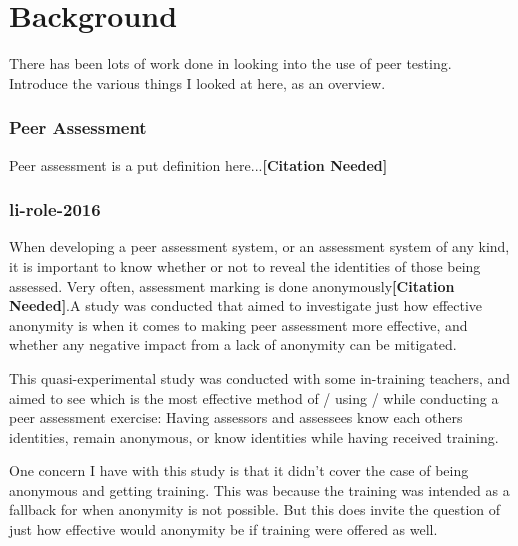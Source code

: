 \documentclass[a4paper,11pt]{report}
\newcommand{\cn}{\textbf{[Citation Needed]}}
\begin{document}
\chapter{Background}
There has been lots of work done in looking into the use of peer testing. Introduce the various things I looked at here, as an overview.
\subsection{Peer Assessment}
Peer assessment is a put definition here...\cn

\subsection{li-role-2016}
When developing a peer assessment system, or an assessment system of any kind, it is important to know whether or not to reveal the identities of those being assessed. Very often, assessment marking is done anonymously\cn.A study was conducted\cite{li_role_2016} that aimed to investigate just how effective anonymity is when it comes to making peer assessment more effective, and whether any negative impact from a lack of anonymity can be mitigated.\par
This quasi-experimental study was conducted with some in-training teachers, and aimed to see which is the most effective method of / using / while conducting a peer assessment exercise: Having assessors and assessees know each others identities, remain anonymous, or know identities while having received training.\par
One concern I have with this study is that it didn't cover the case of being anonymous and getting training. This was because the training was intended as a fallback for when anonymity is not possible. But this does invite the question of just how effective would anonymity be if training were offered as well.\par
\end{document}
